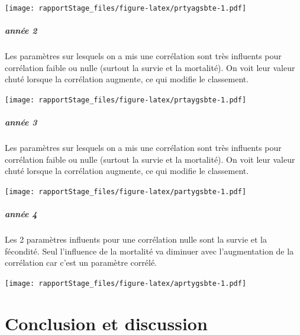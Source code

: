 \documentclass[
]{article}
\begin{document}
\texttt{[image: rapportStage\_files/figure-latex/prtyagsbte-1.pdf]}

\hypertarget{annuxe9e-2-1}{%
\subparagraph{année 2}\label{annuxe9e-2-1}}

Les paramètres sur lesquels on a mis une corrélation sont très influents
pour corrélation faible ou nulle (surtout la survie et la mortalité). On
voit leur valeur chuté lorsque la corrélation augmente, ce qui modifie
le classement.

\texttt{[image: rapportStage\_files/figure-latex/prtaygsbte-1.pdf]}

\hypertarget{annuxe9e-3-4}{%
\subparagraph{année 3}\label{annuxe9e-3-4}}

Les paramètres sur lesquels on a mis une corrélation sont très influents
pour corrélation faible ou nulle (surtout la survie et la mortalité). On
voit leur valeur chuté lorsque la corrélation augmente, ce qui modifie
le classement.

\texttt{[image: rapportStage\_files/figure-latex/partygsbte-1.pdf]}

\hypertarget{annuxe9e-4-4}{%
\subparagraph{année 4}\label{annuxe9e-4-4}}

Les 2 paramètres influents pour une corrélation nulle sont la survie et
la fécondité. Seul l'influence de la mortalité va diminuer avec
l'augmentation de la corrélation car c'est un paramètre corrélé.

\texttt{[image: rapportStage\_files/figure-latex/aprtygsbte-1.pdf]}

\hypertarget{conclusion-et-discussion}{%
\section{Conclusion et discussion}\label{conclusion-et-discussion}}
\end{document}
